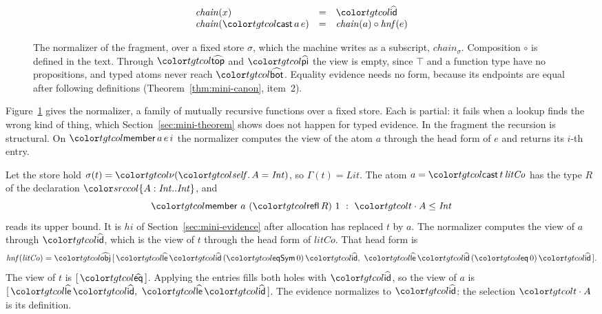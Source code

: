 \begin{figure}[t]
\[\begin{array}{@{}lcl@{}}
\mathit{chain}(x) & = & \form{id} \\
\mathit{chain}(\ev{cast}\,a\,e) & = & \mathit{chain}(a) \circ \mathit{hnf}(e)
\end{array}
\]
\color{black}
\caption{The normalizer of the fragment, over a fixed store $\sigma$, which the machine writes as a subscript, $\mathit{chain}_\sigma$. Composition $\circ$ is defined in the text. Through $\form{top}$ and $\form{pi}$ the view is empty, since $\top$ and a function type have no propositions, and typed atoms never reach $\form{bot}$. Equality evidence needs no form, because its endpoints are equal after following definitions (Theorem~\ref{thm:mini-canon}, item~2).}
\label{fig:mini-normalizer}
\end{figure}

Figure~\ref{fig:mini-normalizer} gives the normalizer, a family of mutually recursive functions over a fixed store. Each is partial: it fails when a lookup finds the wrong kind of thing, which Section~\ref{sec:mini-theorem} shows does not happen for typed evidence. In the fragment the recursion is structural. On $\ev{member}\,a\,e\,i$ the normalizer computes the view of the atom $a$ through the head form of $e$ and returns its $i$-th entry.

\begin{example}\label{ex:mini-sel}
Let the store hold $\sigma(t) = \tgt{\nu(\self.\,A = \mathit{Int})}$, so $\Gamma(t) = \mathit{Lit}$. The atom $a = \ev{cast}\,t\,\mathit{litCo}$ has the type $R$ of the declaration $\dtyp{A}{\mathit{Int}}{\mathit{Int}}$, and
\[
\ev{member}\ a\ (\ev{refl}\,R)\ 1 \ :\ \sel{t}{A} \le \mathit{Int}
\]
reads its upper bound. It is $\mathit{hi}$ of Section~\ref{sec:mini-evidence} after allocation has replaced $t$ by $a$. The normalizer computes the view of $a$ through $\form{id}$, which is the view of $t$ through the head form of $\mathit{litCo}$. That head form is
\[
\mathit{hnf}(\mathit{litCo}) = \form{obj}\,[\,\form{le}\,\form{id}\,(\ev{eqSym}\,0)\,\form{id},\ \form{le}\,\form{id}\,(\ev{eq}\,0)\,\form{id}\,] .
\]
The view of $t$ is $[\,\form{eq}\,]$. Applying the entries fills both holes with $\form{id}$, so the view of $a$ is $[\,\form{le}\,\form{id},\ \form{le}\,\form{id}\,]$. The evidence normalizes to $\form{id}$: the selection $\sel{t}{A}$ is its definition.
\end{example}

